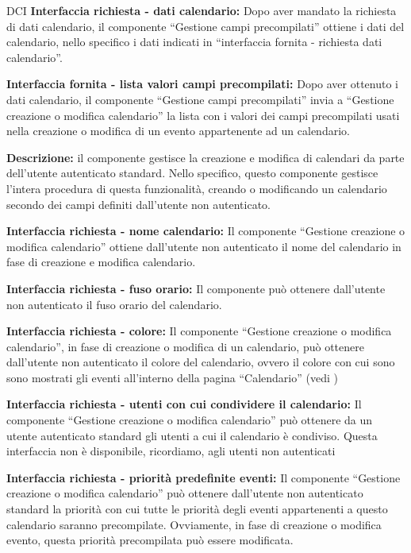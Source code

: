 \begin{listaPersonale}{DCI}
    \textbf{Interfaccia richiesta - dati calendario:} Dopo aver mandato la richiesta di dati calendario, il componente “Gestione campi precompilati” ottiene i dati del calendario, nello specifico i dati indicati in “interfaccia fornita - richiesta dati calendario”.

    \textbf{Interfaccia fornita - lista valori campi precompilati:} Dopo aver ottenuto i dati calendario, il componente “Gestione campi precompilati” invia a “Gestione creazione o modifica calendario” la lista con i valori dei campi precompilati usati nella creazione o modifica di un evento appartenente ad un calendario.



    \textbf{Descrizione:} il componente gestisce la creazione e modifica di calendari da parte dell'utente autenticato standard. Nello specifico, questo componente gestisce l'intera procedura di questa funzionalità, creando o modificando un calendario secondo dei campi definiti dall'utente non autenticato.

    \textbf{Interfaccia richiesta - nome calendario:} Il componente “Gestione creazione o modifica calendario” ottiene dall'utente non autenticato il nome del calendario in fase di creazione e modifica calendario.

    \textbf{Interfaccia richiesta - fuso orario:} Il componente può ottenere dall'utente non autenticato il fuso orario del calendario.

    \textbf{Interfaccia richiesta - colore:} Il componente “Gestione creazione o modifica calendario”, in fase di creazione o modifica di un calendario, può ottenere dall'utente non autenticato il colore del calendario, ovvero il colore con cui sono sono mostrati gli eventi all'interno della pagina “Calendario” (vedi )

    \textbf{Interfaccia richiesta - utenti con cui condividere il calendario:} Il componente “Gestione creazione o modifica calendario” può ottenere da un utente autenticato standard gli utenti a cui il calendario è condiviso. Questa interfaccia non è disponibile, ricordiamo, agli utenti non autenticati

    \textbf{Interfaccia richiesta - priorità predefinite eventi:} Il componente “Gestione creazione o modifica calendario” può ottenere dall'utente non autenticato standard la priorità con cui tutte le priorità degli eventi appartenenti a questo calendario saranno precompilate. Ovviamente, in fase di creazione o modifica evento, questa priorità precompilata può essere modificata.


\end{listaPersonale}
